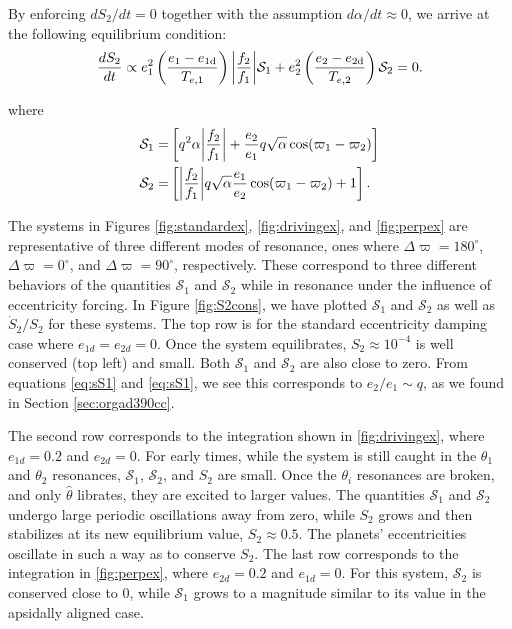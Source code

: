 \documentclass[usenatbib,onecolumn]{mnras}
\DeclarePairedDelimiter{\abs}{|}{|}
\begin{document}
\noindent
By enforcing \(dS_2/dt = 0\) together with the assumption \(d\alpha/dt
\approx 0\), we arrive at the following equilibrium condition:
\begin{align}
  \label{eq:S2eq}
  \frac{dS_2}{dt} \propto e_1^2\left(\frac{e_1-e_{1\rm d}}{T_{e,1}}\right)\abs*{\frac{f_2}{f_1}}
  \mathcal{S}_1
  + e_2^2\left(\frac{e_2-e_{2\rm d}}{T_{e,2}}\right)
  \mathcal{S}_2
  = 0.
\end{align}

\noindent
where
\begin{align}
  \label{eq:sS1}
  \mathcal{S}_1=&\left[
                  q^2\alpha\abs*{\frac{f_2}{f_1}}
                  + \frac{e_2}{e_1}q\sqrt{\alpha}\cos(\varpi_1-\varpi_2)
                  \right]\\
  \label{eq:sS2}
  \mathcal{S}_2=&\left[
                  \abs*{\frac{f_2}{f_1}} q\sqrt{\alpha}
                  \frac{e_1}{e_2}\cos(\varpi_1-\varpi_2) + 1
                  \right].
\end{align}

The systems in Figures \ref{fig:standardex}, \ref{fig:drivingex}, and
\ref{fig:perpex} are representative of three different modes of
resonance, ones where \(\Delta\varpi=180^\circ\),
\(\Delta\varpi=0^\circ\), and \(\Delta\varpi=90^\circ\),
respectively. These correspond to three different behaviors of the
quantities \(\mathcal{S}_1\) and \(\mathcal{S}_2\) while in resonance
under the influence of eccentricity forcing.
In Figure \ref{fig:S2cons}, we have plotted \(\mathcal{S}_1\) and
\(\mathcal{S}_2\) as well as \(\dot S_2/S_2\) for these systems.  The top
row is for the standard eccentricity damping case where
\(e_{1d}=e_{2d}=0\).  Once the system equilibrates, \(S_2\approx 10^{-4}\)
is well conserved (top left) and small. Both \(\mathcal{S}_1\) and
\(\mathcal{S}_2\) are also close to zero. From equations \eqref{eq:sS1}
and \eqref{eq:sS1}, we see this corresponds to \(e_2/e_1 \sim q\), as we
found in Section \ref{sec:orgad390cc}.

The second row corresponds to the integration shown in
\ref{fig:drivingex}, where \(e_{1d}=0.2\) and \(e_{2d}=0\).  For early
times, while the system is still caught in the \(\theta_1\) and
\(\theta_2\) resonances, \(\mathcal{S}_1\), \(\mathcal{S}_2\), and \(S_2\) are
small.  Once the \(\theta_i\) resonances are broken, and only
\(\hat\theta\) librates, they are excited to larger values.  The
quantities \(\mathcal{S}_1\) and \(\mathcal{S}_2\) undergo large periodic
oscillations away from zero, while \(S_2\) grows and then stabilizes at
its new equilibrium value, \(S_2\approx 0.5\). The planets'
eccentricities oscillate in such a way as to conserve \(S_2\).  The last
row corresponds to the integration in \ref{fig:perpex}, where
\(e_{2d}=0.2\) and \(e_{1d}=0\).  For this system, \(\mathcal{S}_2\) is
conserved close to 0, while \(\mathcal{S}_1\) grows to a magnitude
similar to its value in the apsidally aligned case.
\end{document}
